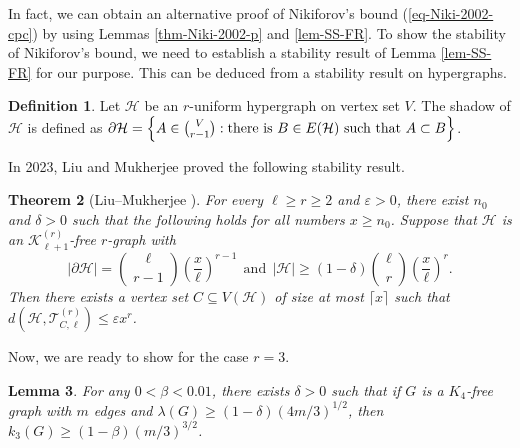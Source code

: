 \documentclass[11pt,a4paper]{article}
\newtheorem{theorem}{Theorem}[section]
\newtheorem{lemma}[theorem]{Lemma}
\theoremstyle{definition}
\newtheorem{defn}[theorem]{Definition}
\theoremstyle{remark}
\begin{document}
In fact, we can obtain an alternative proof of Nikiforov's bound (\ref{eq-Niki-2002-cpc}) by using Lemmas \ref{thm-Niki-2002-p} and \ref{lem-SS-FR}. 
To show the stability of Nikiforov's bound, we need to establish a stability 
result of Lemma \ref{lem-SS-FR} for our purpose. This can be deduced from a stability result on hypergraphs. 

\begin{defn}
Let $\mathcal{H}$ be an $r$-uniform hypergraph on vertex set $V$. 
The shadow of $\mathcal{H}$ is defined as 
$ \partial \mathcal{H} = \left\{A \in \tbinom{V}{r-1} : \text{there is $B\in E(\mathcal{H})$ such that $A\subset B$}  \right\}$. 
\end{defn}

In 2023, Liu and Mukherjee \cite{LM2023} proved 
the following stability result.  


\begin{theorem}[Liu--Mukherjee \cite{LM2023}] \label{thm-LM2022}
For every $\ell \ge r \ge 2$ and $\varepsilon >0$, 
there exist $n_0$ and $\delta >0$ such that 
the following holds for all numbers $x\ge n_0$. 
Suppose that $\mathcal{H}$ is an  $\mathcal{K}_{\ell +1}^{(r)}$-free $r$-graph with 
\[ |\partial \mathcal{H}| = {\ell \choose r-1} \left( \frac{x}{\ell}\right)^{r-1}~~\text{and}~~ 
|\mathcal{H}| \ge (1-\delta ){\ell \choose r} 
\left( \frac{x}{\ell}\right)^r. \]
Then there exists a vertex set $C\subseteq V(\mathcal{H})$ of size at most $\lceil x\rceil$
such that $d(\mathcal{H},\mathcal{T}_{C,\ell}^{(r)}) \le \varepsilon x^r$.  
\end{theorem}


Now, we are ready to show  
  for the case $r=3$. 

\begin{lemma}
    For any $0< \beta<0.01$, there exists $\delta >0$ such that if 
   $G$ is a $K_4$-free graph with $m$ edges and 
    $\lambda (G) \ge (1- \delta )(4m/3)^{1/2}$, then 
    $k_3(G)\ge (1- \beta)(m/3)^{3/2}$. 
\end{lemma}
\end{document}
